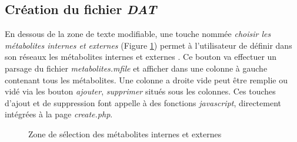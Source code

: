 \subsection{Création du fichier \emph{DAT}}

En dessous de la zone de texte modifiable, une touche nommée \emph{choisir les métabolites internes et externes} (Figure \ref{boutonMET_int_EXT}) permet à l'utilisateur de définir dans son réseaux les métabolites internes et externes . Ce bouton va effectuer un parsage du fichier \emph{metabolites.mfile} et afficher dans une colonne à gauche contenant tous les métabolites. Une colonne a droite vide peut être remplie ou vidé via les bouton \emph{ajouter}, \emph{supprimer} situés sous les colonnes.
Ces touches d'ajout et de suppression font appelle à des fonctions \emph{javascript}, directement intégrées à la page \emph{create.php}.\\

\begin{figure}[!ht]
    \begin{center}
        \caption{Zone de sélection des métabolites internes et externes}
          \label{boutonMET_int_EXT}
      \end{center}   
\end{figure}

